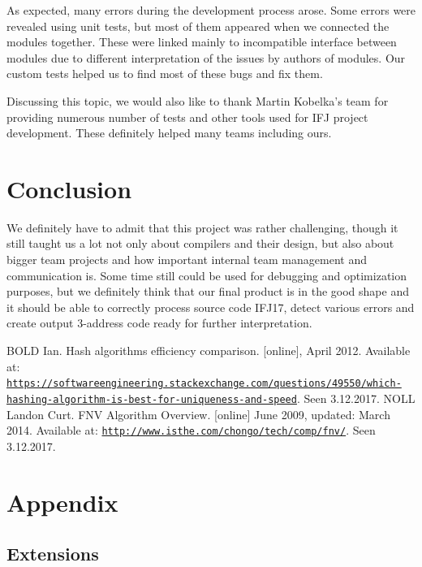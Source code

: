 \documentclass[a4paper, 11pt]{article}
\begin{document}
As expected, many errors during the development process arose. Some errors were revealed using unit tests, but most of them appeared when we connected the modules together. These were linked mainly to incompatible interface between modules due to different interpretation of the issues by authors of modules. Our custom tests helped us to find most of these bugs and fix them.

Discussing this topic, we would also like to thank Martin Kobelka's team for providing numerous number of tests and other tools used for IFJ project development. These definitely helped many teams including ours.

\section{Conclusion}

We definitely have to admit that this project was rather challenging, though it still taught us a lot not only about compilers and their design, but also about bigger team projects and how important internal team management and communication is. Some time still could be used for debugging and optimization purposes, but we definitely think that our final product is in the good shape and it should be able to correctly process source code IFJ17, detect various errors and create output 3-address code ready for further interpretation.

\newpage

\begin{thebibliography}{99}
	 BOLD Ian. Hash algorithms efficiency comparison. [online], April 2012. Available at: \texttt{\url{https://softwareengineering.stackexchange.com/questions/49550/which-hashing-algorithm-is-best-for-uniqueness-and-speed}}. Seen 3.12.2017.
	 NOLL Landon Curt. FNV Algorithm Overview. [online] June 2009, updated: March 2014. Available at: \texttt{\url{http://www.isthe.com/chongo/tech/comp/fnv/}}. Seen 3.12.2017.
\end{thebibliography}

\newpage
{\raggedright
	\section{Appendix}
}

\subsection{Extensions}
\label{sec:extensions} 
\end{document}
